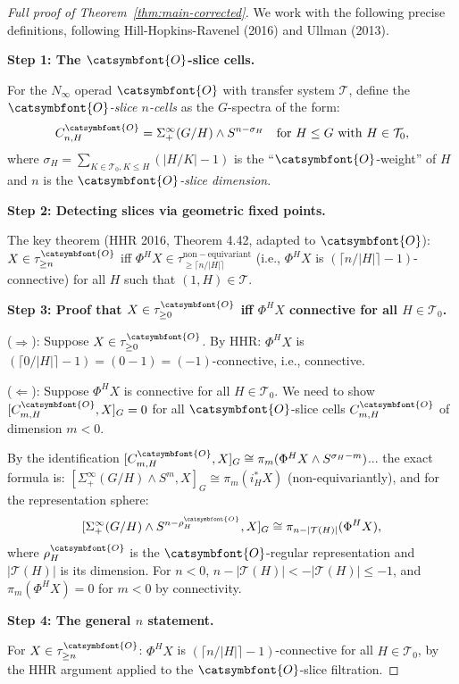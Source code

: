 \documentclass[12pt]{article}
\theoremstyle{definition}
\newcommand{\aO}{{\catsymbfont{O}}}
\begin{document}
\begin{proof}[Full proof of Theorem~\ref{thm:main-corrected}]

We work with the following precise definitions, following Hill-Hopkins-Ravenel (2016) and Ullman (2013).

\textbf{Step 1: The $\aO$-slice cells.}

For the $N_\infty$ operad $\aO$ with transfer system $\mathcal{T}$, define the \emph{$\aO$-slice $n$-cells} as the $G$-spectra of the form:
$$C_{n,H}^{\aO} = \Sigma^\infty_+(G/H)\wedge S^{n-\sigma_H}\quad\text{for }H\leq G\text{ with }H\in\mathcal{T}_0,$$
where $\sigma_H = \sum_{K\in\mathcal{T}_0, K\leq H}(|H/K|-1)$ is the ``$\aO$-weight'' of $H$ and $n$ is the \emph{$\aO$-slice dimension}.

\textbf{Step 2: Detecting slices via geometric fixed points.}

The key theorem (HHR 2016, Theorem 4.42, adapted to $\aO$): $X\in\tau_{\geq n}^{\aO}$ iff $\Phi^H X\in\tau_{\geq \lceil n/|H|\rceil}^{\mathrm{non-equivariant}}$ (i.e., $\Phi^H X$ is $(\lceil n/|H|\rceil-1)$-connective) for all $H$ such that $(1,H)\in\mathcal{T}$.

\textbf{Step 3: Proof that $X\in\tau_{\geq 0}^{\aO}$ iff $\Phi^H X$ connective for all $H\in\mathcal{T}_0$.}

($\Rightarrow$): Suppose $X\in\tau_{\geq 0}^{\aO}$. By HHR: $\Phi^H X$ is $(\lceil 0/|H|\rceil-1) = (0-1)= (-1)$-connective, i.e., connective.

($\Leftarrow$): Suppose $\Phi^H X$ is connective for all $H\in\mathcal{T}_0$. We need to show $[C_{m,H}^{\aO}, X]_G = 0$ for all $\aO$-slice cells $C_{m,H}^{\aO}$ of dimension $m<0$.

By the identification $[C_{m,H}^{\aO},X]_G \cong \pi_m(\Phi^H X\wedge S^{\sigma_H - m})$... the exact formula is: $[\Sigma^\infty_+(G/H)\wedge S^m, X]_G \cong \pi_m(i_H^* X)$ (non-equivariantly), and for the representation sphere:
$$[\Sigma^\infty_+(G/H)\wedge S^{n-\rho_H^{\aO}}, X]_G \cong \pi_{n-|\mathcal{T}(H)|}(\Phi^H X),$$
where $\rho_H^{\aO}$ is the $\aO$-regular representation and $|\mathcal{T}(H)|$ is its dimension. For $n < 0$, $n-|\mathcal{T}(H)| < -|\mathcal{T}(H)|\leq -1$, and $\pi_m(\Phi^H X) = 0$ for $m<0$ by connectivity.

\textbf{Step 4: The general $n$ statement.}

For $X\in\tau_{\geq n}^{\aO}$: $\Phi^H X$ is $(\lceil n/|H|\rceil -1)$-connective for all $H\in\mathcal{T}_0$, by the HHR argument applied to the $\aO$-slice filtration.


\end{proof}
\end{document}
